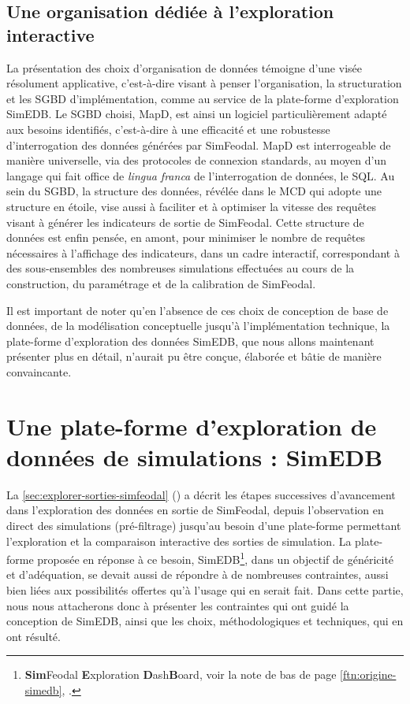 \subsection*{Une organisation dédiée à l'exploration interactive}
La présentation des choix d'organisation de données témoigne d'une visée résolument applicative, c'est-à-dire visant à penser l'organisation, la structuration et les SGBD d'implémentation, comme au service de la plate-forme d'exploration SimEDB.
Le SGBD choisi, MapD, est ainsi un logiciel particulièrement adapté aux besoins identifiés, c'est-à-dire à une efficacité et une robustesse d'interrogation des données générées par SimFeodal.
MapD est interrogeable de manière universelle, via des protocoles de connexion standards, au moyen d'un langage qui fait office de \textit{lingua franca} de l'interrogation de données, le SQL.
Au sein du SGBD, la structure des données, révélée dans le MCD qui adopte une structure \og en étoile\fg{}, vise aussi à faciliter et à optimiser la vitesse des requêtes visant à générer les indicateurs de sortie de SimFeodal.
Cette structure de données est enfin pensée, en amont, pour minimiser le nombre de requêtes nécessaires à l'affichage des indicateurs, dans un cadre interactif, correspondant à des sous-ensembles des nombreuses simulations effectuées au cours de la construction, du paramétrage et de la calibration de SimFeodal.

Il est important de noter qu'en l'absence de ces choix de conception de base de données, de la modélisation conceptuelle jusqu'à l'implémentation technique, la plate-forme d'exploration des données SimEDB, que nous allons maintenant présenter plus en détail, n'aurait pu être conçue, élaborée et bâtie de manière convaincante.

\clearpage
\section[Une plate-forme d'exploration de données de simulations : SimEDB]{Une plate-forme d'exploration de données de simulations : SimEDB%
	}\label{sec:SimEDB}

La \cref{sec:explorer-sorties-simfeodal} () a décrit les étapes successives d'avancement dans l'exploration des données en sortie de SimFeodal, depuis l'observation en direct des simulations (\og pré-filtrage\fg{}) jusqu'au besoin d'une plate-forme permettant l'exploration et la comparaison interactive des sorties de simulation.
La plate-forme proposée en réponse à ce besoin, SimEDB\footnote{
	\textbf{Sim}Feodal \textbf{E}xploration \textbf{D}ash\textbf{B}oard, voir la note de bas de page \ref{ftn:origine-simedb}, .
}, dans un objectif de généricité et d'adéquation, se devait aussi de répondre à de nombreuses contraintes, aussi bien liées aux possibilités offertes qu'à l'usage qui en serait fait.
Dans cette partie, nous nous attacherons donc à présenter les contraintes qui ont guidé la conception de SimEDB, ainsi que les choix, méthodologiques et techniques, qui en ont résulté.\vspace{-0.5cm}

